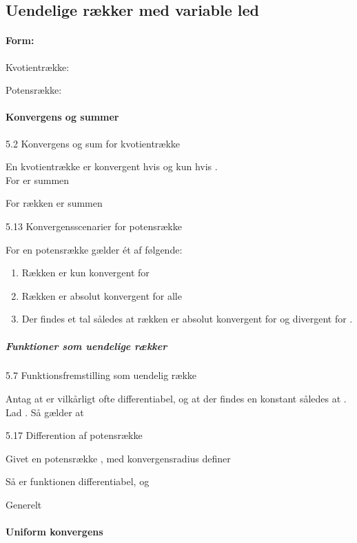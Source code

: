 \documentclass[
]{article}
\providecommand{\tightlist}{%
  \setlength{\itemsep}{0pt}\setlength{\parskip}{0pt}}
\begin{document}
\subsection{Uendelige rækker med variable
led}\label{uendelige-ruxe6kker-med-variable-led}

\paragraph{Form:}\label{form-4}

Kvotientrække:

Potensrække:

\paragraph{Konvergens og summer}\label{konvergens-og-summer}

5.2 Konvergens og sum for kvotientrække

En kvotientrække {} er konvergent hvis og kun hvis {}.\\
For {} er summen

For rækken {} er summen

5.13 Konvergensscenarier for potensrække

For en potensrække {} gælder ét af følgende:

\begin{enumerate}
\tightlist
\item
  Rækken er kun konvergent for {}
\item
  Rækken er absolut konvergent for alle {}
\item
  Der findes et tal {} således at rækken er absolut konvergent for {} og
  divergent for {}.
\end{enumerate}

\subparagraph{Funktioner som uendelige
rækker}\label{funktioner-som-uendelige-ruxe6kker}

5.7 Funktionsfremstilling som uendelig række

Antag at {} er vilkårligt ofte differentiabel, og at der findes en
konstant {} således at {}.\\
Lad {}. Så gælder at

5.17 Differention af potensrække

Givet en potensrække {}, med konvergensradius {} definer

Så er funktionen {} differentiabel, og

Generelt

\paragraph{Uniform konvergens}\label{uniform-konvergens}
\end{document}
